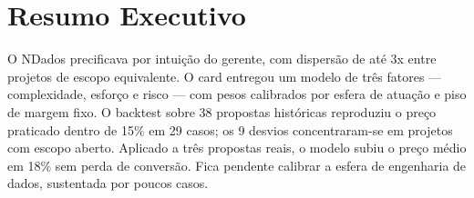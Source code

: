 
\section{Resumo Executivo}

O NDados precificava por intuição do gerente, com dispersão de até 3x entre projetos de escopo equivalente. O card entregou um modelo de três fatores — complexidade, esforço e risco — com pesos calibrados por esfera de atuação e piso de margem fixo. O backtest sobre 38 propostas históricas reproduziu o preço praticado dentro de 15\% em 29 casos; os 9 desvios concentraram-se em projetos com escopo aberto. Aplicado a três propostas reais, o modelo subiu o preço médio em 18\% sem perda de conversão. Fica pendente calibrar a esfera de engenharia de dados, sustentada por poucos casos.
